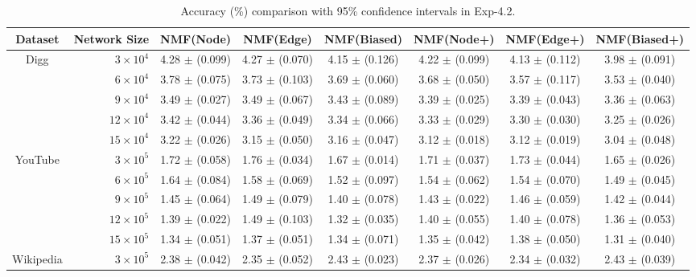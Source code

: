 \documentclass[10pt,journal,compsoc]{IEEEtran}
\newcommand{\Node}{{\sf NMF(Node)}\xspace}
\newcommand{\Edge}{{\sf NMF(Edge)}\xspace}
\newcommand{\Biased}{{\sf NMF(Biased)}\xspace}
\newcommand{\Digg}{{\sf Digg}\xspace}
\newcommand{\YouTube}{{\sf YouTube}\xspace}
\newcommand{\Wikipedia}{{\sf Wikipedia}\xspace}
\newcommand{\Nodep}{{\sf NMF(Node+)}\xspace}
\newcommand{\Edgep}{{\sf NMF(Edge+)}\xspace}
\newcommand{\Biasedp}{{\sf NMF(Biased+)}\xspace}
\begin{document}
\begin{table}
\caption{Accuracy (\%) comparison with 95\% confidence intervals in Exp-4.2.}
\label{tab_accuracy_6}
\vspace{-2ex}
\centering
\newcommand{\tabincell}[2]{\begin{tabular}{@{}#1@{}}#2\end{tabular}}
\begin{tabular}{c|r|c|c|c|c|c|c}
\hline \hline Dataset  & Network Size &  \Node & \Edge & \Biased & \Nodep & \Edgep & \Biasedp   \\
\hline
\multirow{5}{*}{\Digg}
 & $3 \times 10^4 $  & 4.28 $\pm$ (0.099) & 4.27 $\pm$ (0.070) & 4.15 $\pm$ (0.126) & 4.22 $\pm$ (0.099) & 4.13 $\pm$ (0.112) & 3.98 $\pm$ (0.091) \\
 & $6 \times 10^4 $  & 3.78 $\pm$ (0.075) & 3.73 $\pm$ (0.103) & 3.69 $\pm$ (0.060) & 3.68 $\pm$ (0.050) & 3.57 $\pm$ (0.117) & 3.53 $\pm$ (0.040)  \\
 & $9 \times 10^4 $  & 3.49 $\pm$ (0.027) & 3.49 $\pm$ (0.067) & 3.43 $\pm$ (0.089) & 3.39 $\pm$ (0.025) & 3.39 $\pm$ (0.043) & 3.36 $\pm$ (0.063)  \\
 & $12 \times 10^4 $ & 3.42 $\pm$ (0.044) & 3.36 $\pm$ (0.049) & 3.34 $\pm$ (0.066) & 3.33 $\pm$ (0.029) & 3.30 $\pm$ (0.030) & 3.25 $\pm$ (0.026) \\
 & $15 \times 10^4 $ & 3.22 $\pm$ (0.026) & 3.15 $\pm$ (0.050) & 3.16 $\pm$ (0.047) & 3.12 $\pm$ (0.018) & 3.12 $\pm$ (0.019) & 3.04 $\pm$ (0.048)  \\
\hline
\multirow{5}{*}{\YouTube}
 & $3 \times 10^5 $  & 1.72 $\pm$ (0.058) & 1.76 $\pm$ (0.034) & 1.67 $\pm$ (0.014) & 1.71 $\pm$ (0.037) & 1.73 $\pm$ (0.044) & 1.65 $\pm$ (0.026)  \\
 & $6 \times 10^5 $  & 1.64 $\pm$ (0.084) & 1.58 $\pm$ (0.069) & 1.52 $\pm$ (0.097) & 1.54 $\pm$ (0.062) & 1.54 $\pm$ (0.070) & 1.49 $\pm$ (0.045)  \\
 & $9 \times 10^5 $  & 1.45 $\pm$ (0.064) & 1.49 $\pm$ (0.079) & 1.40 $\pm$ (0.078) & 1.43 $\pm$ (0.022) & 1.46 $\pm$ (0.059) & 1.42 $\pm$ (0.044)  \\
 & $12 \times 10^5 $ & 1.39 $\pm$ (0.022) & 1.49 $\pm$ (0.103) & 1.32 $\pm$ (0.035) & 1.40 $\pm$ (0.055) & 1.40 $\pm$ (0.078) & 1.36 $\pm$ (0.053)  \\
 & $15 \times 10^5 $ & 1.34 $\pm$ (0.051) & 1.37 $\pm$ (0.051) & 1.34 $\pm$ (0.071) & 1.35 $\pm$ (0.042) & 1.38 $\pm$ (0.050) & 1.31 $\pm$ (0.040)  \\
\hline
\multirow{5}{*}{\Wikipedia}
 & $3 \times 10^5 $  & 2.38 $\pm$ (0.042) & 2.35 $\pm$ (0.052) & 2.43 $\pm$ (0.023) & 2.37 $\pm$ (0.026) & 2.34 $\pm$ (0.032) & 2.43 $\pm$ (0.039)  \\

\end{tabular}
\end{table}
\end{document}
